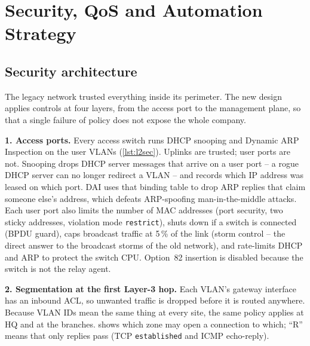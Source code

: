 \section{Security, QoS and Automation Strategy}\label{sec:sqa}

\subsection{Security architecture}\label{sec:security}
The legacy network trusted everything inside its perimeter. The new design applies controls at four
layers, from the access port to the management plane, so that a single failure of policy does not expose
the whole company.

\textbf{1. Access ports.} Every access switch runs DHCP snooping and Dynamic ARP Inspection on the user
VLANs (\cref{lst:l2sec}). Uplinks are trusted; user ports are not. Snooping drops DHCP server messages that
arrive on a user port -- a rogue DHCP server can no longer redirect a VLAN -- and records which IP address
was leased on which port. DAI uses that binding table to drop ARP replies that claim someone else's address,
which defeats ARP-spoofing man-in-the-middle attacks. Each user port also limits the number of MAC
addresses (port security, two sticky addresses, violation mode \texttt{restrict}), shuts down if a switch is
connected (BPDU guard), caps broadcast traffic at 5\,\% of the link (storm control -- the direct answer to
the broadcast storms of the old network), and rate-limits DHCP and ARP to protect the switch CPU.
Option~82 insertion is disabled because the switch is not the relay agent.


\textbf{2. Segmentation at the first Layer-3 hop.} Each VLAN's gateway interface has an inbound ACL, so
unwanted traffic is dropped before it is routed anywhere. Because VLAN IDs mean the same thing at every site,
the same policy applies at HQ and at the branches.  shows which zone may open a
connection to which; ``R'' means that only replies pass (TCP \texttt{established} and ICMP echo-reply).

